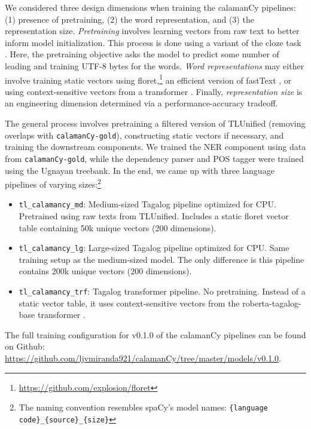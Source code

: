\documentclass[11pt]{article}
\begin{document}
We considered three design dimensions when training the calamanCy pipelines: (1) presence of pretraining, (2) the word representation, and (3) the representation size.
\textit{Pretraining} involves learning vectors from raw text to better inform model initialization.
This process is done using a variant of the cloze task \citep{Devlin2019BERTPO}.
Here, the pretraining objective asks the model to predict some number of leading and training UTF-8 bytes for the words.
\textit{Word representations} may either involve training static vectors using floret,\footnote[3]{\url{https://github.com/explosion/floret}} an efficient version of fastText \citep{Bojanowski2016EnrichingWV}, or using context-sensitive vectors from a transformer \citep{Vaswani2017AttentionIA}.
Finally, \textit{representation size} is an engineering dimension determined via a performance-accuracy tradeoff.

The general process involves pretraining a filtered version of TLUnified (removing overlaps with \texttt{calamanCy-gold}), constructing static vectors if necessary, and training the downstream components.
We trained the NER component using data from \texttt{calamanCy-gold}, while the dependency parser and POS tagger were trained using the Ugnayan treebank.
In the end, we came up with three language pipelines of varying sizes:\footnote[4]{The naming convention resembles spaCy's model names: \texttt{\{language code\}\_\{source\}\_\{size\}}}

\begin{itemize}
  \item \texttt{tl\_calamancy\_md}: Medium-sized Tagalog pipeline optimized for CPU. Pretrained using raw texts from TLUnified. Includes a static floret vector table containing 50k unique vectors (200 dimensions).
  \item \texttt{tl\_calamancy\_lg}: Large-sized Tagalog pipeline optimized for CPU. Same training setup as the medium-sized model. The only difference is this pipeline contains 200k unique vectors (200 dimensions).
  \item \texttt{tl\_calamancy\_trf}: Tagalog transformer pipeline. No pretraining. Instead of a static vector table, it uses context-sensitive vectors from the roberta-tagalog-base transformer \citep{Cruz2021ImprovingLL}.
\end{itemize}

The full training configuration for v0.1.0 of the calamanCy pipelines can be found on Github: \url{https://github.com/ljvmiranda921/calamanCy/tree/master/models/v0.1.0}.
\end{document}

